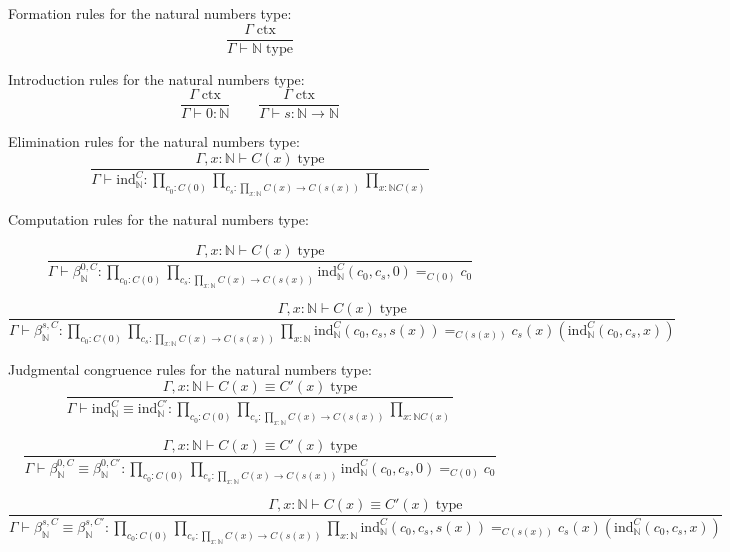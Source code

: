 \documentclass{book}
\begin{document}
Formation rules for the natural numbers type:
$$\frac{\Gamma \; \mathrm{ctx}}{\Gamma \vdash \mathbb{N} \; \mathrm{type}}$$

Introduction rules for the natural numbers type:
$$\frac{\Gamma \; \mathrm{ctx}}{\Gamma \vdash 0:\mathbb{N}} \qquad \frac{\Gamma \; \mathrm{ctx}}{\Gamma \vdash s:\mathbb{N} \to \mathbb{N}}$$

Elimination rules for the natural numbers type:
$$\frac{\Gamma, x:\mathbb{N} \vdash C(x) \; \mathrm{type}}{\Gamma \vdash \mathrm{ind}_\mathbb{N}^C:\prod_{c_0:C(0)} \prod_{c_s:\prod_{x:\mathbb{N}} C(x) \to C(s(x))} \prod_{x:\mathbb{N} C(x)}}$$

Computation rules for the natural numbers type:

$$\frac{\Gamma, x:\mathbb{N} \vdash C(x) \; \mathrm{type}}{\Gamma \vdash \beta_\mathbb{N}^{0, C}:\prod_{c_0:C(0)} \prod_{c_s:\prod_{x:\mathbb{N}} C(x) \to C(s(x))} \mathrm{ind}_\mathbb{N}^C(c_0, c_s, 0) =_{C(0)} c_0}$$

$$\frac{\Gamma, x:\mathbb{N} \vdash C(x) \; \mathrm{type}}{\Gamma \vdash \beta_\mathbb{N}^{s, C}:\prod_{c_0:C(0)} \prod_{c_s:\prod_{x:\mathbb{N}} C(x) \to C(s(x))} \prod_{x:\mathbb{N}} \mathrm{ind}_\mathbb{N}^C(c_0, c_s, s(x)) =_{C(s(x))} c_s(x)(\mathrm{ind}_\mathbb{N}^C(c_0, c_s, x))}$$

Judgmental congruence rules for the natural numbers type:
$$\frac{\Gamma, x:\mathbb{N} \vdash C(x) \equiv C'(x) \; \mathrm{type}}{\Gamma \vdash \mathrm{ind}_\mathbb{N}^C \equiv \mathrm{ind}_\mathbb{N}^{C'}:\prod_{c_0:C(0)} \prod_{c_s:\prod_{x:\mathbb{N}} C(x) \to C(s(x))} \prod_{x:\mathbb{N} C(x)}}$$

$$\frac{\Gamma, x:\mathbb{N} \vdash C(x) \equiv C'(x) \; \mathrm{type}}{\Gamma \vdash \beta_\mathbb{N}^{0, C} \equiv \beta_\mathbb{N}^{0, C'}:\prod_{c_0:C(0)} \prod_{c_s:\prod_{x:\mathbb{N}} C(x) \to C(s(x))} \mathrm{ind}_\mathbb{N}^C(c_0, c_s, 0) =_{C(0)} c_0}$$

$$\frac{\Gamma, x:\mathbb{N} \vdash C(x) \equiv C'(x) \; \mathrm{type}}{\Gamma \vdash \beta_\mathbb{N}^{s, C} \equiv \beta_\mathbb{N}^{s, C'}:\prod_{c_0:C(0)} \prod_{c_s:\prod_{x:\mathbb{N}} C(x) \to C(s(x))} \prod_{x:\mathbb{N}} \mathrm{ind}_\mathbb{N}^C(c_0, c_s, s(x)) =_{C(s(x))} c_s(x)(\mathrm{ind}_\mathbb{N}^C(c_0, c_s, x))}$$
\end{document}
